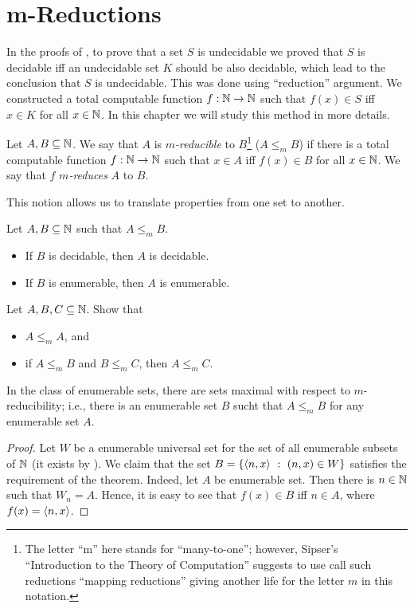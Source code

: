 \chapter{m-Reductions}
In the proofs of , to prove
that a set $S$ is undecidable we proved that $S$ is decidable iff an undecidable
set $K$ should be also decidable, which lead to the conclusion that $S$ is
undecidable. This was done using ``reduction'' argument. We constructed a total
computable function $f : {\mathbb{N}} \to {\mathbb{N}}$ such that $f(x) \in S$ iff $x \in K$ for all
$x \in {\mathbb{N}}$. In
this chapter we will study this method in more details.

\begin{definition}
  Let $A, B \subseteq {\mathbb{N}}$. We say that $A$ is \emph{$m$-reducible} to
  $B$\footnote{%
    The letter ``m'' here stands for ``many-to-one''; however, Sipser's
    ``Introduction to the Theory of Computation'' suggests to use call such
    reductions ``mapping reductions'' giving another life for the letter $m$ in
    this notation.
  }
  ($A \le_m B$) if there is a total computable function $f : {\mathbb{N}} \to {\mathbb{N}}$ such
  that $x \in A$ iff $f(x) \in B$ for all $x \in {\mathbb{N}}$. We say that $f$
  \emph{$m$-reduces} $A$ to $B$.
\end{definition}

This notion allows us to translate properties from one set to another.
\begin{theorem}
  Let $A, B \subseteq {\mathbb{N}}$ such that $A \le_m B$.
  \begin{itemize}
    \item If $B$ is decidable, then $A$ is decidable.
    \item If $B$ is enumerable, then $A$ is enumerable.
  \end{itemize}
\end{theorem}

\begin{exercise}
  Let $A, B, C \subseteq {\mathbb{N}}$. Show that
  \begin{itemize}
    \item $A \le_m A$, and 
    \item if $A \le_m B$ and $B \le_m C$, then $A \le_m C$.
  \end{itemize}
\end{exercise}

\begin{theorem}
  In the class of enumerable sets, there are sets maximal with respect to
  $m$-reducibility; i.e., there is an enumerable set $B$ sucht that $A \le_m B$
  for any enumerable set $A$.
\end{theorem}
\begin{proof}
  Let $W$ be a enumerable universal set for the set of all enumerable subsets of
  ${\mathbb{N}}$ (it exists by ). 
  We claim that the set $B = \set[(n, x) \in W]{\pair{n}{x}}$ satisfies the
  requirement of the theorem. Indeed, let $A$ be enumerable set. Then there is
  $n \in {\mathbb{N}}$ such that $W_n = A$. Hence, it is easy to see that $f(x) \in B$ iff 
  $n \in A$, where $f(x) = \langle {n}, {x} \rangle$.
\end{proof}

